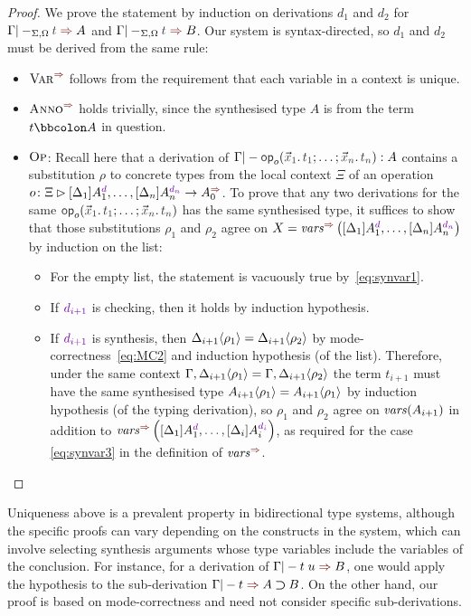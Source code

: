 \begin{proof}%
  We prove the statement by induction on derivations $d_1$ and $d_2$ for $\Gamma |-_{\Sigma, \Omega} \isTerm{t} \syn A$ and $\Gamma |-_{\Sigma, \Omega} \isTerm{t} \syn B$.
  Our system is syntax-directed, so $d_1$ and $d_2$ must be derived from the same rule: 
  \begin{itemize}
    \item $\SynRule{Var}$ follows from the requirement that each variable in a context is unique.
    \item $\SynRule{Anno}$ holds trivially, since the synthesised type $A$ is from the term $t \annotate A$ in question.
    \item $\textnormal{\textsc{Op}}$: Recall here that a derivation of\/ $\Gamma |- \tmOpts : A$ contains a substitution $\rho$ to concrete types from the local context $\Xi$ of an operation $o\colon \Xi \rhd [\Delta_{1}] A_{1}^{\dir{d}}, \ldots, [\Delta_n]A_{n}^{\dir{d_n}} \to A_0^{\syn}$.
      To prove that any two derivations for the same $\tmOpts$ has the same synthesised type, it suffices to show that those substitutions $\rho_1$ and $\rho_2$ agree on $X = \synvar\left([\Delta_{1}] A_{1}^{\dir{d}}, \ldots, [\Delta_n]A_{n}^{\dir{d_n}}\right)$ by induction on the list:
      \begin{itemize}
        \item For the empty list, the statement is vacuously true by~\eqref{eq:synvar1}.
        \item If $\dir{d_{i+1}}$ is checking, then it holds by induction hypothesis.
        \item If $\dir{d_{i+1}}$ is synthesis, then ${\Delta_{i+1}}\!\left<{\rho_1}\right> = {\Delta_{i+1}}\!\left<{\rho_2}\right>$ by mode-correctness~\eqref{eq:MC2} and induction hypothesis (of the list).
          Therefore, under the same context $\Gamma, {\Delta_{i+1}}\!\left<{\rho_1}\right> = \Gamma, {\Delta_{i+1}}\!\left<{\rho_2}\right>$ the term $t_{i+1}$ must have the same synthesised type ${A_{i+1}}\!\left<{\rho_1}\right> = {A_{i+1}}\!\left<{\rho_1}\right>$ by induction hypothesis (of the typing derivation), so $\rho_1$ and $\rho_2$ agree on $\mathit{vars}(A_{i+1})$ in addition to $\synvar\left([\Delta_{1}] A_{1}^{\dir{d}}, \ldots, [\Delta_i]A_{i}^{\dir{d_i}}\right)$, as required for the case \eqref{eq:synvar3} in the definition of $\synvar$.
      \end{itemize}
  \end{itemize}
\end{proof}

Uniqueness above is a prevalent property in bidirectional type systems, although the specific proofs can vary depending on the constructs in the system, which can involve selecting synthesis arguments whose type variables include the variables of the conclusion.
For instance, for a derivation of $\Gamma |- t\;u \syn B$, one would apply the hypothesis to the sub-derivation $\Gamma |- t \syn A \bto B$.
On the other hand, our proof is based on mode-correctness and need not consider specific sub-derivations.

